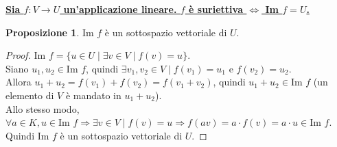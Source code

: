 \documentclass[a4paper]{article}
\theoremstyle{definition}
\newtheorem*{prop}{Proposizione}
\begin{document}
\underline{\textbf{Sia $f: V \rightarrow U$ un'applicazione lineare. $f$ è suriettiva $\Leftrightarrow$ Im $f = U$.}}

\begin{prop}
	Im $f$ è un sottospazio vettoriale di $U$.
\end{prop}
\begin{proof}
	Im $f = \{u \in U \mid \exists v \in V \mid f(v) = u\}$. \\
	Siano $u_1, u_2 \in \text{Im } f$, quindi $\exists v_1, v_2 \in V \mid f(v_1) = u_1$ e $f(v_2) = u_2$. \\
	Allora $u_1 + u_2 = f(v_1) + f(v_2) = f(v_1 + v_2)$, quindi $u_1 + u_2 \in \text{Im } f$ (un elemento di $V$ è mandato in $u_1 + u_2$). \\
	Allo stesso modo, $\forall a \in K, u \in \text{Im } f \Rightarrow \exists v \in V \mid f(v) = u \Rightarrow f(av) = a \cdot f(v) = a \cdot u \in \text{Im } f$. \\
	Quindi Im $f$ è un sottospazio vettoriale di $U$.
\end{proof}
\end{document}
